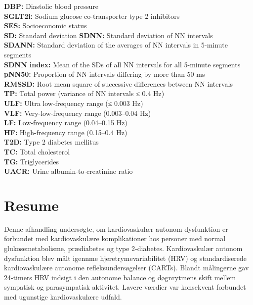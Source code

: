 \documentclass[
  a4paper,
  headsepline=true,
  open=any]{scrbook}
\begin{document}
\textbf{DBP:} Diastolic blood pressure\\
\textbf{SGLT2i:} Sodium glucose co-transporter type 2 inhibitors\\
\textbf{SES:} Socioeconomic status\\
\textbf{SD:} Standard deviation \textbf{SDNN:} Standard deviation of NN
intervals\\
\textbf{SDANN:} Standard deviation of the averages of NN intervals in
5-minute segments\\
\textbf{SDNN index:} Mean of the SDs of all NN intervals for all
5-minute segments\\
\textbf{pNN50:} Proportion of NN intervals differing by more than 50
ms\\
\textbf{RMSSD:} Root mean square of successive differences between NN
intervals\\
\textbf{TP:} Total power (variance of NN intervals ≤ 0.4 Hz)\\
\textbf{ULF:} Ultra low-frequency range (≤ 0.003 Hz)\\
\textbf{VLF:} Very-low-frequency range (0.003--0.04 Hz)\\
\textbf{LF:} Low-frequency range (0.04--0.15 Hz)\\
\textbf{HF:} High-frequency range (0.15--0.4 Hz)\\
\textbf{T2D:} Type 2 diabetes mellitus\\
\textbf{TC:} Total cholesterol\\
\textbf{TG:} Triglycerides\\
\textbf{UACR:} Urine albumin-to-creatinine ratio


\hypertarget{resume}{%
\chapter*{Resume}\label{resume}}


Denne afhandling undersøgte, om kardiovaskulær autonom dysfunktion er
forbundet med kardiovaskulære komplikationer hos personer med normal
glukosemetabolisme, prædiabetes og type 2-diabetes. Kardiovaskulær
autonom dysfunktion blev målt igennme hjeretrymevariabilitet (HRV) og
standardiserede kardiovaskulære autonome refleksundersøgelser (CARTs).
Blandt målingerne gav 24-timers HRV indsigt i den autonome balance og
døgnrytmens skift mellem sympatisk og parasympatisk aktivitet. Lavere
værdier var konsekvent forbundet med ugunstige kardiovaskulære udfald.
\end{document}
